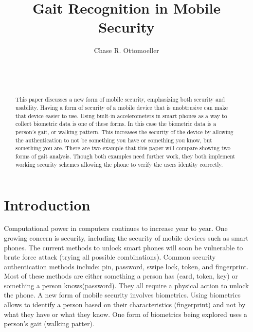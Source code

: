 \documentclass{sig-alternate}
\begin{document}

\title{Gait Recognition in Mobile Security}


\author{
\alignauthor
Chase R. Ottomoeller\\
	\\
	\\
	\\
}

\maketitle




\begin{abstract}
This paper discusses a new form of mobile security, emphasizing both security and usability. Having a form of security of a mobile device that is unobtrusive can make that device easier to use. Using built-in accelerometers in smart phones as a way to collect biometric data is one of these forms. In this case the biometric data is a person's gait, or walking pattern. This increases the security of the device by allowing the authentication to not be something you have or something you know, but something you are. There are two example that this paper will compare showing two forms of gait analysis. Though both examples need further work, they both implement working security schemes allowing the phone to  verify the users identity correctly.  
\end{abstract}




\section{Introduction}
	Computational power in computers continues to increase year to year. One growing concern is security, including the security of mobile devices such as smart phones. The current methods to unlock smart phones will soon be vulnerable to brute force  attack (trying all possible combinations). Common security authentication methods include: pin, password, swipe lock, token, and fingerprint. Most of these methods are either something a person has (card, token, key) or something a person knows(password). They all require a physical action to unlock the phone. A new form of mobile security involves biometrics. Using biometrics allows to identify a person based on their characteristics (fingerprint) and not by what they have or what they know.  One form of biometrics being explored uses a person's gait (walking patter). 
	
\end{document}
